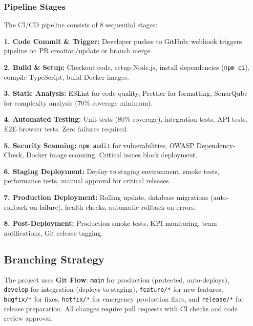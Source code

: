 \documentclass[12pt,a4paper]{article}
\begin{document}
\subsubsection{Pipeline Stages}

The CI/CD pipeline consists of 8 sequential stages:

\begin{tcolorbox}[colback=lightgray, colframe=secondaryblue, boxrule=0.8pt, arc=3pt, left=10pt, right=10pt, top=8pt, bottom=8pt]

\textbf{1. Code Commit \& Trigger:} Developer pushes to GitHub; webhook triggers pipeline on PR creation/update or branch merge.

\textbf{2. Build \& Setup:} Checkout code, setup Node.js, install dependencies (\texttt{npm ci}), compile TypeScript, build Docker images.

\textbf{3. Static Analysis:} ESLint for code quality, Prettier for formatting, SonarQube for complexity analysis (70\% coverage minimum).

\textbf{4. Automated Testing:} Unit tests (80\% coverage), integration tests, API tests, E2E browser tests. Zero failures required.

\textbf{5. Security Scanning:} \texttt{npm audit} for vulnerabilities, OWASP Dependency-Check, Docker image scanning. Critical issues block deployment.

\textbf{6. Staging Deployment:} Deploy to staging environment, smoke tests, performance tests, manual approval for critical releases.

\textbf{7. Production Deployment:} Rolling update, database migrations (auto-rollback on failure), health checks, automatic rollback on errors.

\textbf{8. Post-Deployment:} Production smoke tests, KPI monitoring, team notifications, Git release tagging.

\end{tcolorbox}

\subsection{Branching Strategy}

The project uses \textbf{Git Flow}: \texttt{main} for production (protected, auto-deploys), \texttt{develop} for integration (deploys to staging), \texttt{feature/*} for new features, \texttt{bugfix/*} for fixes, \texttt{hotfix/*} for emergency production fixes, and \texttt{release/*} for release preparation. All changes require pull requests with CI checks and code review approval.
\end{document}
